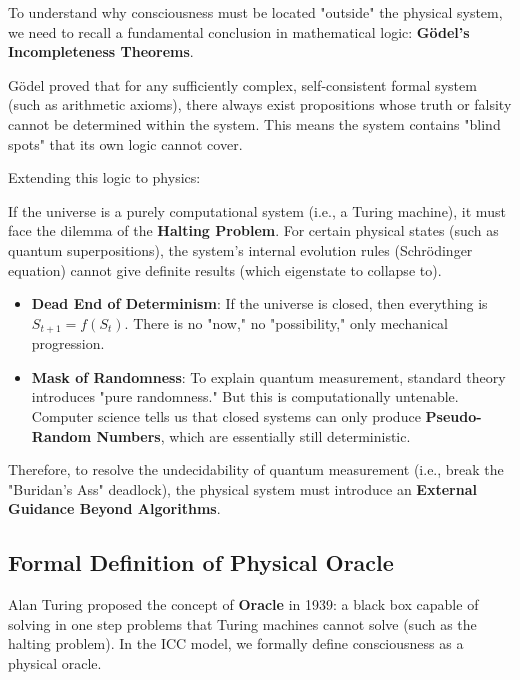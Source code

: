 To understand why consciousness must be located "outside" the physical system, we need to recall a fundamental conclusion in mathematical logic: \textbf{Gödel's Incompleteness Theorems}.

Gödel proved that for any sufficiently complex, self-consistent formal system (such as arithmetic axioms), there always exist propositions whose truth or falsity cannot be determined within the system. This means the system contains "blind spots" that its own logic cannot cover.

Extending this logic to physics:

If the universe is a purely computational system (i.e., a Turing machine), it must face the dilemma of the \textbf{Halting Problem}. For certain physical states (such as quantum superpositions), the system's internal evolution rules (Schrödinger equation) cannot give definite results (which eigenstate to collapse to).

\begin{itemize}
\item \textbf{Dead End of Determinism}: If the universe is closed, then everything is $S_{t+1} = f(S_t)$. There is no "now," no "possibility," only mechanical progression.

\item \textbf{Mask of Randomness}: To explain quantum measurement, standard theory introduces "pure randomness." But this is computationally untenable. Computer science tells us that closed systems can only produce \textbf{Pseudo-Random Numbers}, which are essentially still deterministic.
\end{itemize}

Therefore, to resolve the undecidability of quantum measurement (i.e., break the "Buridan's Ass" deadlock), the physical system must introduce an \textbf{External Guidance Beyond Algorithms}.

\subsection{Formal Definition of Physical Oracle}

Alan Turing proposed the concept of \textbf{Oracle} in 1939: a black box capable of solving in one step problems that Turing machines cannot solve (such as the halting problem). In the ICC model, we formally define consciousness as a physical oracle.

